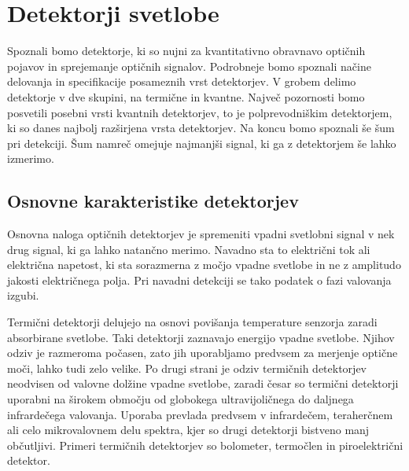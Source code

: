 
\chapter{Detektorji svetlobe}

Spoznali bomo detektorje, ki so nujni za kvantitativno obravnavo
optičnih pojavov in sprejemanje optičnih signalov. Podrobneje bomo spoznali
načine delovanja in specifikacije posameznih vrst detektorjev.
V grobem delimo detektorje v dve skupini, na termične in 
kvantne. Največ pozornosti bomo posvetili posebni vrsti kvantnih 
detektorjev, to je polprevodniškim detektorjem, ki so danes najbolj razširjena vrsta detektorjev.
Na koncu bomo spoznali še šum pri detekciji. Šum namreč omejuje najmanjši 
signal, ki ga z detektorjem še lahko izmerimo.

\section{Osnovne karakteristike detektorjev}
Osnovna naloga optičnih detektorjev je spremeniti vpadni svetlobni signal 
v nek drug signal, ki ga lahko natančno merimo. Navadno sta to električni tok 
ali električna napetost, ki sta sorazmerna z močjo vpadne svetlobe 
in ne z amplitudo jakosti električnega polja. Pri navadni detekciji se tako
podatek o fazi valovanja izgubi. 

Termični detektorji delujejo na osnovi povišanja temperature senzorja 
zaradi absorbirane svetlobe. Taki detektorji zaznavajo energijo 
vpadne svetlobe. Njihov odziv je razmeroma počasen, zato jih uporabljamo
predvsem za merjenje optične moči, lahko tudi zelo velike. 
Po drugi strani je odziv termičnih detektorjev neodvisen
od valovne dolžine vpadne svetlobe, zaradi česar so termični detektorji uporabni na 
širokem območju od globokega ultravijoličnega do daljnega infrardečega valovanja. 
Uporaba
prevlada predvsem v infrardečem, teraherčnem ali celo mikrovalovnem delu spektra, kjer so 
drugi detektorji bistveno manj občutljivi. 
Primeri termičnih detektorjev so bolometer, termočlen in piroelektrični detektor.

